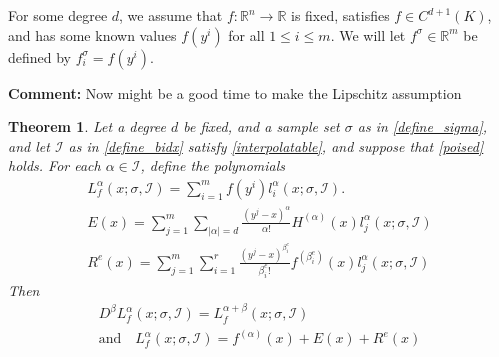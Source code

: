 \documentclass{article}
\newenvironment{comment}
  {\par\medskip
   \color{red}%
   \begin{framed}
   \textbf{Comment: }\ignorespaces}
 {\end{framed}
  \medskip}
\newtheorem{theorem}{Theorem}[section]
\theoremstyle{case}
\newcommand{\reals}{\mathbb R}
\newcommand{\Rn}{\mathbb R^n}
\newcommand{\Rm}{\mathbb R^m}
\newcommand{\bidx}{{\mathcal I}}
\begin{document}
For some degree $d$, we assume that $f : \Rn \to \reals$ is fixed, satisfies $f \in C^{d+1}(K)$,
and has some known values $f(y^i)$ for all $1 \le i \le m$.
We will let $f^{\sigma} \in \Rm$ be defined by $f^{\sigma}_i = f(y^i)$.
\begin{comment}
Now might be a good time to make the Lipschitz assumption
\end{comment}


\begin{theorem}
\label{theorem_10}
Let a degree $d$ be fixed, and a sample set $\sigma$ as in \cref{define_sigma}, and let $\bidx$ as in \cref{define_bidx} satisfy \cref{interpolatable}, and suppose that
\cref{poised} holds.
For each $\alpha \in \bidx$, define the polynomials
\begin{align}
L_f^{\alpha}(x; \sigma, \bidx) = \sum_{i=1}^m f(y^i) l_i^{\alpha}(x; \sigma, \bidx). \label{define_L} \\
E(x) = \sum_{j=1}^m \sum_{|\alpha|=d}\frac{\left(y^j - x\right)^{\alpha}}{\alpha!} H^{(\alpha)}(x)l_j^{\alpha}(x; \sigma, \bidx) \\
R^e(x) = \sum_{j=1}^m\sum_{i=1}^r \frac{\left(y^j - x\right)^{\beta^e_i}}{\beta^e_i!}f^{(\beta^e_i)}(x)l_j^{\alpha}(x; \sigma, \bidx)
\end{align}
Then 
\begin{align}
D^{\beta}L_f^{\alpha}(x; \sigma, \bidx) = L_f^{\alpha + \beta}(x; \sigma, \bidx) \label{linear_in_differentiation} \\
\textrm{and}\quad L_f^{\alpha}(x; \sigma, \bidx) = f^{(\alpha)}(x) + E(x) + R^e(x) \label{error_bound_formula}
\end{align}
\end{theorem}
\end{document}
